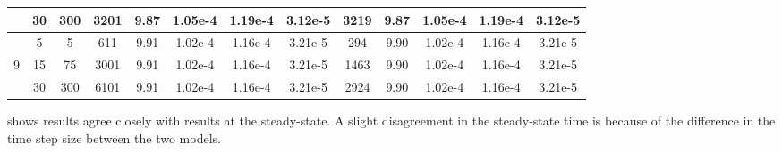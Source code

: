 \begin{table}[ht]
{\begin{tabular}{|c|c|c|c|c|c|c|c|c|c|c|c|c|}
      & 30 & 300 & 3201 & 9.87 & 1.05e-4 & 1.19e-4 & 3.12e-5 & 3219 & 9.87 & 1.05e-4 & 1.19e-4 & 3.12e-5 \\
    \hline
      & 5  & 5   & 611  & 9.91 & 1.02e-4 & 1.16e-4 & 3.21e-5 & 294  & 9.90 & 1.02e-4 & 1.16e-4 & 3.21e-5 \\
    9 & 15 & 75  & 3001 & 9.91 & 1.02e-4 & 1.16e-4 & 3.21e-5 & 1463 & 9.90 & 1.02e-4 & 1.16e-4 & 3.21e-5 \\
      & 30 & 300 & 6101 & 9.91 & 1.02e-4 & 1.16e-4 & 3.21e-5 & 2924 & 9.90 & 1.02e-4 & 1.16e-4 & 3.21e-5 \\
    \hline
\end{tabular}}
\label{tab:DumuxVsMatlab}
\end{table}

 shows \MATLAB results agree closely with \DuMuX results at the steady-state. A slight disagreement in the steady-state time is 
because of the difference in the time step size between the two models. \\

